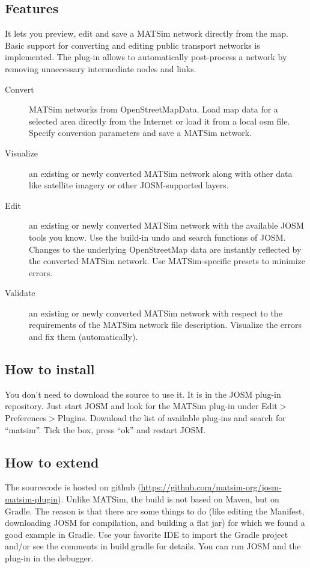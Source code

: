 \subsection{Features}
It lets you preview, edit and save a MATSim network directly from the map. Basic support for converting and editing public transport networks is implemented. The plug-in allows to automatically post-process a network by removing unnecessary intermediate nodes and links.
\begin{description}
\item[Convert] MATSim networks from OpenStreetMapData. Load map data for a selected area directly from the Internet or load it from a local osm file. Specify conversion parameters and save a MATSim network.
\item[Visualize] an existing or newly converted MATSim network along with other data like satellite imagery or other JOSM-supported layers.
\item[Edit] an existing or newly converted MATSim network with the available JOSM tools you know. Use the build-in undo and search functions of JOSM. Changes to the underlying OpenStreetMap data are instantly reflected by the converted MATSim network. Use MATSim-specific presets to minimize errors.
\item[Validate] an existing or newly converted MATSim network with respect to the requirements of the MATSim network file description. Visualize the errors and fix them (automatically). 
\end{description}

\subsection{How to install}
You don't need to download the source to use it. It is in the JOSM plug-in repository. Just start JOSM and look for the MATSim plug-in under Edit$>$Preferences$>$Plugins. Download the list of available plug-ins and search for ``matsim''. Tick the box, press ``ok'' and restart JOSM.

\subsection{How to extend}
The sourcecode is hosted on github (\url{https://github.com/matsim-org/josm-matsim-plugin}). Unlike MATSim, the build is not based on Maven, but on Gradle. The reason is that there are some things to do (like editing the Manifest, downloading JOSM for compilation, and building a flat jar) for which we found a good example in Gradle. Use your favorite IDE to import the Gradle project and/or see the comments in build.gradle for details. You can run JOSM and the plug-in in the debugger.
 
